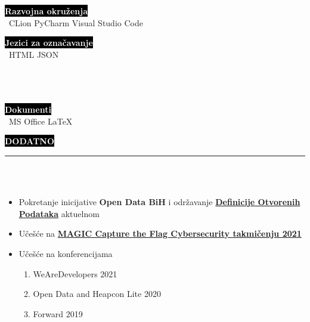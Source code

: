 \documentclass[9pt]{developercv} %
\begin{document}
\begin{minipage}[t]{0.4\textwidth}
	\vspace{-\baselineskip}
	
	\colorbox{black}{{\textcolor{white}{\textbf{Razvojna okruženja}}}}\smallskip\\\
	{CLion} \hspace{10} {PyCharm} \hspace{10} {Visual Studio Code}\smallskip\\
\end{minipage}
\hfill
\begin{minipage}[t]{0.3\textwidth}
	\vspace{-\baselineskip}
	
	\colorbox{black}{{\textcolor{white}{\textbf{Jezici za označavanje}}}}\smallskip\\\
	{HTML} \hspace{10} {JSON}\smallskip\\\\\\\
\end{minipage}
\hfill
\begin{minipage}[t]{0.2\textwidth}
	\vspace{-\baselineskip}
	
	\colorbox{black}{{\textcolor{white}{\textbf{Dokumenti}}}}\smallskip\\\
	{MS Office} \hspace{10} {LaTeX}\\
\end{minipage}


\colorbox{black}{{\textcolor{white}{\textbf{\MakeUppercase{Dodatno}}}}}
\par\noindent\rule{\textwidth}{2px}\\\\

    \begin{itemize}
        \item Pokretanje inicijative {\textbf{Open Data BiH}} i održavanje {\href{https://opendefinition.org/od/2.1/bs/}{{\textbf{Definicije Otvorenih Podataka}}}} aktuelnom
        \item Učešće na {\textbf{\href{https://magicinc.org/programs/cybersecurity/capture-the-flag}{MAGIC Capture the Flag Cybersecurity takmičenju 2021}}}
        \item Učešće na konferencijama
        \begin{enumerate}
            \item WeAreDevelopers 2021
            \item Open Data and Heapcon Lite 2020
            \item Forward 2019
        \end{enumerate}
    \end{itemize}
\end{document}
